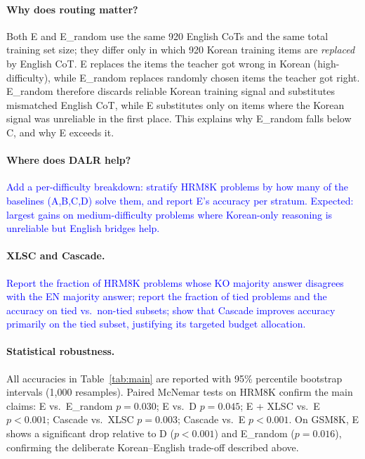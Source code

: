 \documentclass{article}
\newcommand{\note}[1]{\textcolor{blue}{{#1}}}
\begin{document}
\paragraph{Why does routing matter?}
Both E and E\_random use the same 920 English CoTs and the same total
training set size; they differ only in which 920 Korean training items
are \emph{replaced} by English CoT. E replaces the items the teacher
got wrong in Korean (high-difficulty), while E\_random replaces
randomly chosen items the teacher got right. E\_random therefore
discards reliable Korean training signal and substitutes mismatched
English CoT, while E substitutes only on items where the Korean signal
was unreliable in the first place. This explains why E\_random falls
below C, and why E exceeds it.

\paragraph{Where does DALR help?}
\note{Add a per-difficulty breakdown: stratify HRM8K problems by how
many of the baselines (A,B,C,D) solve them, and report E's accuracy
per stratum. Expected: largest gains on medium-difficulty problems
where Korean-only reasoning is unreliable but English bridges help.}

\paragraph{XLSC and Cascade.}
\note{Report the fraction of HRM8K problems whose KO majority answer
disagrees with the EN majority answer; report the fraction of tied
problems and the accuracy on tied vs.\ non-tied subsets; show that
Cascade improves accuracy primarily on the tied subset, justifying its
targeted budget allocation.}

\paragraph{Statistical robustness.}
All accuracies in Table~\ref{tab:main} are reported with 95\%
percentile bootstrap intervals (1{,}000 resamples). Paired McNemar
tests on HRM8K confirm the main claims:
E vs.\ E\_random $p{=}0.030$;
E vs.\ D $p{=}0.045$;
E + XLSC vs.\ E $p{<}0.001$;
Cascade vs.\ XLSC $p{=}0.003$;
Cascade vs.\ E $p{<}0.001$.
On GSM8K, E shows a significant drop relative to D ($p{<}0.001$) and
E\_random ($p{=}0.016$), confirming the deliberate Korean--English
trade-off described above.
\end{document}
